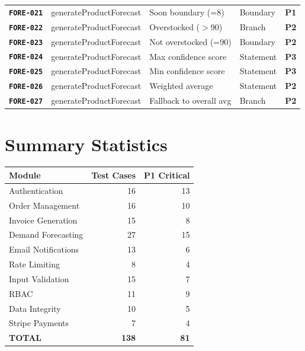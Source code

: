 \documentclass[12pt,a4paper]{report}
\newcommand{\testid}[1]{\texttt{\textbf{\color{secondary}#1}}}
\newcommand{\pone}{\textbf{\color{p1red}P1}}
\newcommand{\ptwo}{\textbf{\color{p2orange}P2}}
\newcommand{\pthree}{\textbf{\color{p3blue}P3}}
\begin{document}
\begin{longtable}{p{2cm}p{3.5cm}p{5cm}p{1.5cm}c}
  \testid{FORE-021} & generateProductForecast & Soon boundary (=8) & Boundary & \pone \\
  \testid{FORE-022} & generateProductForecast & Overstocked ($>$90) & Branch & \ptwo \\
  \testid{FORE-023} & generateProductForecast & Not overstocked (=90) & Boundary & \ptwo \\
  \testid{FORE-024} & generateProductForecast & Max confidence score & Statement & \pthree \\
  \testid{FORE-025} & generateProductForecast & Min confidence score & Statement & \pthree \\
  \testid{FORE-026} & generateProductForecast & Weighted average & Statement & \ptwo \\
  \testid{FORE-027} & generateProductForecast & Fallback to overall avg & Branch & \ptwo \\
  \bottomrule
\end{longtable}

\section{Summary Statistics}

\begin{center}
\begin{tabular}{lrr}
  \toprule
  \textbf{Module} & \textbf{Test Cases} & \textbf{P1 Critical} \\
  \midrule
  Authentication          & 16 & 13 \\
  Order Management        & 16 & 10 \\
  Invoice Generation      & 15 &  8 \\
  Demand Forecasting      & 27 & 15 \\
  Email Notifications     & 13 &  6 \\
  Rate Limiting           &  8 &  4 \\
  Input Validation        & 15 &  7 \\
  RBAC                    & 11 &  9 \\
  Data Integrity          & 10 &  5 \\
  Stripe Payments         &  7 &  4 \\
  \midrule
  \textbf{TOTAL}          & \textbf{138} & \textbf{81} \\
  \bottomrule
\end{tabular}
\end{center}


\end{document}
